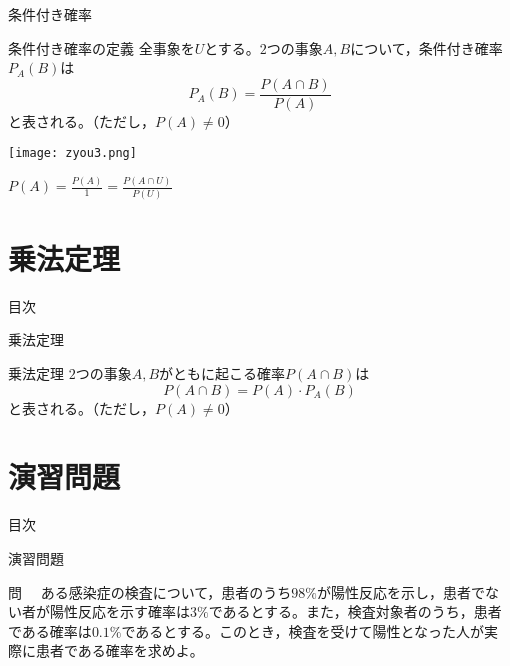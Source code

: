 \documentclass[aspectratio=169, dvipdfmx, 11pt]{beamer}
\begin{document}
\begin{frame}{条件付き確率}
    \begin{block}{条件付き確率の定義}
	全事象を$U$とする。$2$つの事象$A,B$について，条件付き確率$P_A(B)$は
	\begin{equation}
		P_A(B)=\frac{P(A\cap B)}{P(A)}
	\end{equation}
	と表される。（ただし，$P(A)\ne 0$）
    \end{block}

\begin{minipage}{.4\textwidth}
	\centering\texttt{[image: zyou3.png]}
\end{minipage}
	\hfill
\begin{minipage}{.5\textwidth}
	\begin{tcolorbox}[colframe=blue,
    colback=blue!10!white,
    colbacktitle=blue!40!white,
    coltitle=black, fonttitle=\bfseries,
    title=memo]
$P(A)=\frac{P(A)}{1}=\frac{P(A\cap U)}{P(U)}$
	\end{tcolorbox}
\end{minipage}

\end{frame}


\section{乗法定理}
\begin{frame}{目次}
    \tableofcontents[currentsection]
\end{frame}


\begin{frame}{乗法定理}
    \begin{block}{乗法定理}
	$2$つの事象$A,B$がともに起こる確率$P(A\cap B)$は
	\begin{equation}
		P(A\cap B)=P(A)\cdot P_A(B)
	\end{equation}
	と表される。（ただし，$P(A)\ne 0$）
    \end{block}
\end{frame}


\section{演習問題}
\begin{frame}{目次}
    \tableofcontents[currentsection]
\end{frame}


\begin{frame}{演習問題}
\begin{block}{問}
　ある感染症の検査について，患者のうち$98\%$が陽性反応を示し，患者でない者が陽性反応を示す確率は$3\%$であるとする。また，検査対象者のうち，患者である確率は$0.1\%$であるとする。このとき，検査を受けて陽性となった人が実際に患者である確率を求めよ。
\end{block}
\end{frame}
\end{document}
